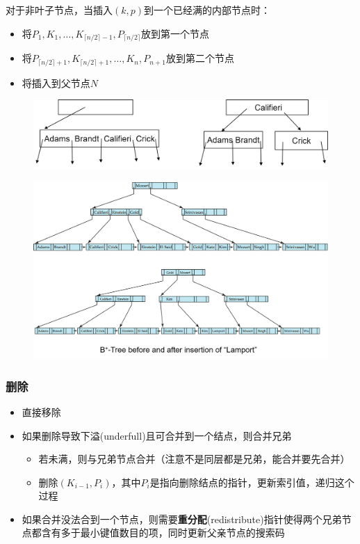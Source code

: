 对于非叶子节点，当插入$(k,p)$到一个已经满的内部节点时：
\begin{itemize}
	\item 将$P_1,K_1,\ldots,K_{\lceil n/2\rceil-1},P_{\lceil n/2\rceil}$放到第一个节点
	\item 将$P_{\lceil n/2\rceil+1},K_{\lceil n/2\rceil+1},\ldots,K_n,P_{n+1}$放到第二个节点
	\item 将插入到父节点$N$
\end{itemize}
\begin{figure}[H]
\centering
\includegraphics[width=0.6\linewidth]{fig/bp-tree_insertion3.png}
\end{figure}
\begin{figure}[H]
\centering
\includegraphics[width=0.8\linewidth]{fig/bp-tree_insertion2.png}
\end{figure}

\subsubsection{删除}
\begin{itemize}
	\item 直接移除
	\item 如果删除导致下溢(underfull)且可合并到一个结点，则合并兄弟
	\begin{itemize}
		\item 若未满，则与兄弟节点合并（注意不是同层都是兄弟，能合并要先合并）
		\item 删除$(K_{i-1},P_i)$，其中$P_i$是指向删除结点的指针，更新索引值，递归这个过程
	\end{itemize}
	\item 如果合并没法合到一个节点，则需要\textbf{重分配}(redistribute)指针使得两个兄弟节点都含有多于最小键值数目的项，同时更新父亲节点的搜索码
\end{itemize}

